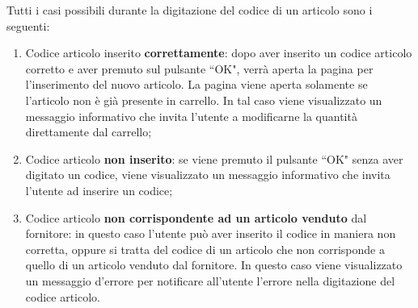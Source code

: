 \newpage

Tutti i casi possibili durante la digitazione del codice di un articolo sono i seguenti:
\begin{enumerate}
	\item Codice articolo inserito \textbf{correttamente}: dopo aver inserito un codice articolo corretto e aver premuto sul pulsante ``OK", verrà aperta
	la pagina per l'inserimento del nuovo articolo. La pagina viene aperta
	solamente se l'articolo non è già presente in carrello. In tal caso viene visualizzato un messaggio informativo che invita l'utente
	a modificarne la quantità direttamente dal carrello;
	\item Codice articolo \textbf{non inserito}: se viene premuto il pulsante ``OK" senza aver digitato un codice, viene visualizzato un messaggio
	informativo che invita l'utente ad inserire un codice;
	\item Codice articolo \textbf{non corrispondente ad un articolo venduto} dal fornitore: in questo caso l'utente può aver inserito il codice in
	maniera non corretta, oppure si tratta del codice di un articolo che non corrisponde a quello di un articolo venduto dal fornitore. In 
	questo caso viene visualizzato un messaggio d'errore per notificare all'utente l'errore nella digitazione del codice articolo.
\end{enumerate}

